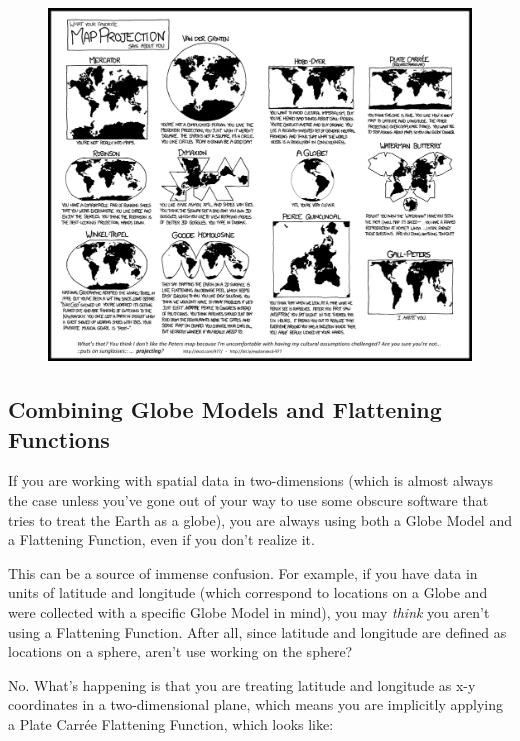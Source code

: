 \documentclass[11pt]{article}
\begin{document}
\begin{figure}[h!]
	\begin{center}
		\caption{}\label{xkcd}
		\includegraphics[width = \textwidth]{media/xkcd_projections.pdf}
	\end{center}
\end{figure}

\subsection{Combining Globe Models and Flattening Functions}

If you are working with spatial data in two-dimensions (which is almost always the case unless you've gone out of your way to use some obscure software that tries to treat the Earth as a globe), you are {\color{red}always} using both a Globe Model and a Flattening Function, {\color{red} even if you don't realize it.}

This can be a source of immense confusion. For example, if you have data in units of latitude and longitude (which correspond to locations on a Globe and were collected with a specific Globe Model in mind), you may \emph{think} you aren't using a Flattening Function. After all, since latitude and longitude are defined as locations on a sphere, aren't use working on the sphere?

No. What's happening is that you are treating latitude and longitude as x-y coordinates in a two-dimensional plane, which means you are implicitly applying a Plate Carr\'ee Flattening Function, which looks like:
\end{document}
